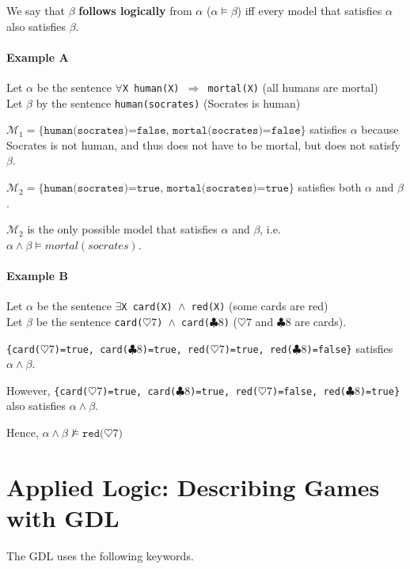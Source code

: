 We say that $\beta$ \textbf{follows logically} from $\alpha$ ($\alpha \models
\beta$) iff every model that satisfies $\alpha$ also satisfies $\beta$.

\paragraph{Example A} Let $\alpha$ be the sentence \texttt{$\forall$X human(X)
$\Rightarrow$ mortal(X)} (all humans are mortal)\\
Let $\beta$ by the sentence \texttt{human(socrates)} (Socrates is human)


$\mathcal{M}_1 = \texttt{\{human(socrates)=false, mortal(socrates)=false\}}$ satisfies
$\alpha$ because Socrates is not human, and thus does not have to be mortal,
but does not satisfy $\beta$.

$\mathcal{M}_2 = \texttt{\{human(socrates)=true, mortal(socrates)=true\}}$ satisfies both
$\alpha$ and $\beta$.

$\mathcal{M}_2$ is the only possible model that satisfies $\alpha$ and $\beta$,
i.e. $\alpha \land \beta \models mortal(socrates)$.

\paragraph{Example B} Let $\alpha$ be the sentence \texttt{$\exists$X card(X) $\land$
red(X)} (some cards are red)\\
Let $\beta$ be the sentence \texttt{card($\heartsuit 7$) $\land$
card($\clubsuit 8$)} ($\heartsuit 7$ and $\clubsuit 8$ are cards).

\texttt{\{card($\heartsuit 7$)=true, card($\clubsuit 8$)=true, red($\heartsuit 7$)=true,
red($\clubsuit 8$)=false\}} satisfies $\alpha \land \beta$.

However, \texttt{\{card($\heartsuit 7$)=true, card($\clubsuit 8$)=true,
red($\heartsuit 7$)=false, red($\clubsuit 8$)=true\}} also satisfies $\alpha \land \beta$.

Hence, $\alpha \land \beta \not\models \texttt{red($\heartsuit 7$)}$

\section{Applied Logic: Describing Games with GDL}
The GDL uses the following keywords.

